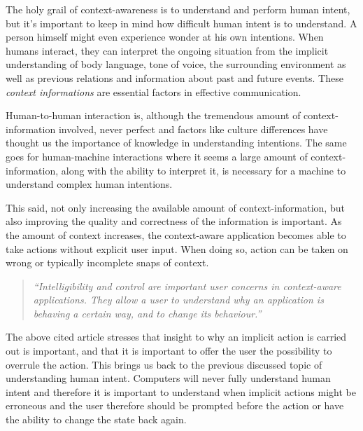 \documentclass[../report.tex]{subfiles}
\begin{document}
The holy grail of context-awareness is to understand and perform human intent, but it's important to keep in mind how difficult human intent is to understand. A person himself might even experience wonder at his own intentions. When humans interact, they can interpret the ongoing situation from the implicit understanding of body language, tone of voice, the surrounding environment as well as previous relations and information about past and future events. These \textit{context informations} are essential factors in effective communication.

Human-to-human interaction is, although the tremendous amount of context-information involved, never perfect and factors like culture differences have thought us the importance of knowledge in understanding intentions. The same goes for human-machine interactions where it seems a large amount of context-information, along with the ability to interpret it, is necessary for a machine to understand complex human intentions.



This said, not only increasing the available amount of context-information, but also improving the quality and correctness of the information is important. As the amount of context increases, the context-aware application becomes able to take actions without explicit user input. When doing so, action can be taken on wrong or typically incomplete snaps of context. 


\begin{quote}
\textit{``Intelligibility and control are important user concerns in context-aware applications. They allow a user to understand why an application is behaving a certain way, and to change its behaviour.''} \cite{Dey and Newberger (2009)}
\end{quote} 

The above cited article stresses that insight to why an implicit action is carried out is important, and that it is important to offer the user the possibility to overrule the action. This brings us back to the previous discussed topic of understanding human intent. Computers will never fully understand human intent and therefore it is important to understand when implicit actions might be erroneous and the user therefore should be prompted before the action or have the ability to change the state back again.
\end{document}
